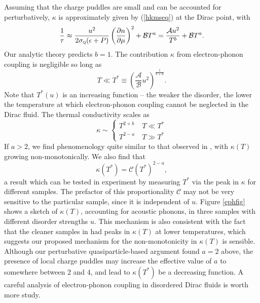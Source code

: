 \documentclass[10pt, oneside]{book}
\begin{document}
\begin{doublespace}
Assuming that the charge puddles are small and can be accounted for perturbatively,  $\kappa$ is approximately given by (\ref{hkmseq}) at the Dirac point, with \begin{equation}
\frac{1}{\tau} \approx  \frac{u^2}{2\sigma_{\textsc{q}} (\epsilon+P)}\left(\frac{\partial n}{\partial \mu}\right)^2 +  \mathcal{B}T^a = \frac{\mathcal{A} u^2}{T^b} + \mathcal{B}T^a.
\end{equation}
Our analytic theory predicts $b=1$.  The contribution $\kappa$ from electron-phonon coupling is negligible so long as \begin{equation}
T \ll  T^* \equiv  \left(\frac{\mathcal{A}}{\mathcal{B}}u^2\right)^{\frac{1}{b+a}}.
\end{equation}
Note that $T^*(u)$ is an increasing function -- the weaker the disorder, the lower the temperature at which electron-phonon coupling cannot be neglected in the Dirac fluid.   The thermal conductivity scales as \begin{equation}
\kappa \sim \left\lbrace\begin{array}{ll}  T^{2+b} &\  T\ll T^* \\ T^{2-a} &\ T\gg T^*\end{array}\right.
\end{equation}
If $a>2$, we find phenomenology quite similar to that observed in \cite{Crossno1058}, with $\kappa(T)$ growing non-monotonically.   We also find that \begin{equation}
\kappa(T^*) = \mathcal{C} (T^*)^{2-a},
\end{equation}
a result which can be tested in experiment by measuring $T^*$ via the peak in $\kappa$ for different samples.  The prefactor of this proportionality $\mathcal{C}$ may not be very sensitive to the particular sample, since it is independent of $u$.   Figure \ref{ephfig} shows a sketch of $\kappa(T)$, accounting for acoustic phonons, in three samples with different disorder strengths $u$.   This mechanism is also consistent with the fact that the cleaner samples in \cite{Crossno1058} had peaks in $\kappa(T)$ at lower temperatures, which suggests our proposed mechanism for the non-monotonicity in $\kappa(T)$ is sensible.   Although our perturbative quasiparticle-based argument found $a=2$ above, the presence of local charge puddles may increase the effective value of $a$ to somewhere between 2 and 4, and lead to $\kappa(T^*)$ be a decreasing function.   A careful analysis of electron-phonon coupling in disordered Dirac fluids is worth more study.   


\end{doublespace}
\end{document}
